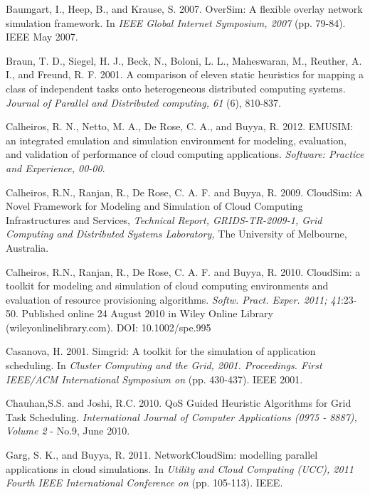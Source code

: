 \documentclass[times, 10pt,twocolumn]{article}
\begin{document}
\begin{thebibliography}{1}


Baumgart, I., Heep, B., and Krause, S. 2007. OverSim: A flexible overlay network simulation framework. In {\em IEEE Global Internet Symposium, 2007} (pp. 79-84). IEEE May 2007.

 Braun, T. D., Siegel, H. J., Beck, N., Boloni, L. L., Maheswaran, M., Reuther, A. I., and Freund, R. F. 2001. A comparison of eleven static heuristics for mapping a class of independent tasks onto heterogeneous distributed computing systems. {\em Journal of Parallel and Distributed computing, 61} (6), 810-837.

 Calheiros, R. N., Netto, M. A., De Rose, C. A., and Buyya, R. 2012. EMUSIM: an integrated emulation and simulation environment for modeling, evaluation, and validation of performance of cloud computing applications. {\em Software: Practice and Experience, 00-00}.

 Calheiros, R.N., Ranjan, R., De Rose, C. A. F. and Buyya, R. 2009. CloudSim: A Novel Framework for Modeling and Simulation of Cloud Computing Infrastructures and Services, {\em Technical Report, GRIDS-TR-2009-1, Grid Computing and Distributed Systems Laboratory,} The University of Melbourne, Australia.

 Calheiros, R.N., Ranjan, R., De Rose, C. A. F. and Buyya, R. 2010. CloudSim: a toolkit for modeling and simulation of cloud computing environments and evaluation of resource provisioning algorithms. {\em Softw. Pract. Exper. 2011; 41}:23-50. Published online 24 August 2010 in Wiley Online Library (wileyonlinelibrary.com). DOI: 10.1002/spe.995

Casanova, H. 2001. Simgrid: A toolkit for the simulation of application scheduling. In {\em Cluster Computing and the Grid, 2001. Proceedings. First IEEE/ACM International Symposium on} (pp. 430-437). IEEE 2001.

 Chauhan,S.S. and Joshi, R.C. 2010. QoS Guided Heuristic Algorithms for Grid Task Scheduling. {\em International Journal of Computer Applications (0975 - 8887), Volume 2} - No.9, June 2010.

 Garg, S. K., and Buyya, R. 2011. NetworkCloudSim: modelling parallel applications in cloud simulations. In {\em Utility and Cloud Computing (UCC), 2011 Fourth IEEE International Conference on} (pp. 105-113). IEEE.


\end{thebibliography}
\end{document}
